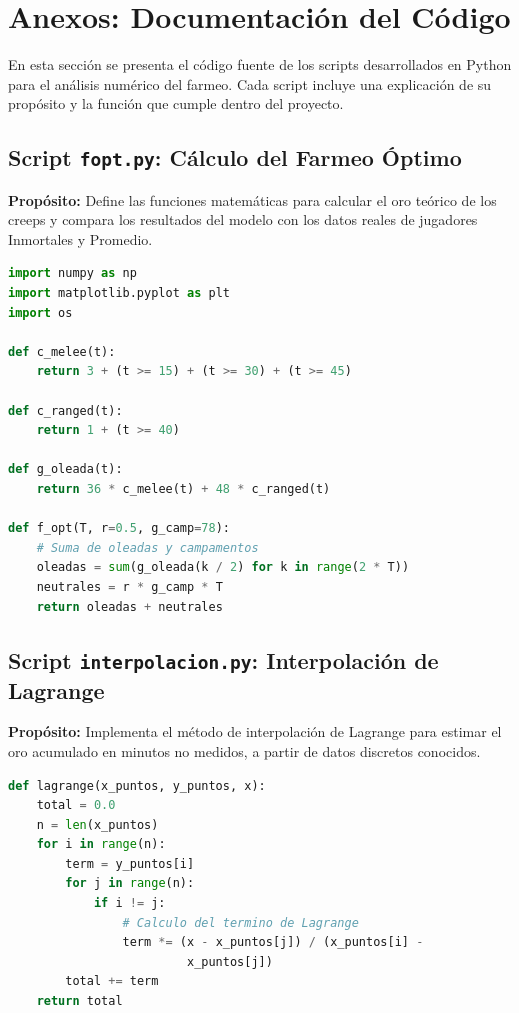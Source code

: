 \section{Anexos: Documentación del Código}

En esta sección se presenta el código fuente de los scripts desarrollados en Python para el análisis numérico del farmeo. Cada script incluye una explicación de su propósito y la función que cumple dentro del proyecto.

\subsection{Script \texttt{fopt.py}: Cálculo del Farmeo Óptimo}
\textbf{Propósito:} Define las funciones matemáticas para calcular el oro teórico de los creeps y compara los resultados del modelo con los datos reales de jugadores Inmortales y Promedio.

\begin{lstlisting}[language=Python, frame=single, rulecolor=\color{black}, backgroundcolor=\color{backcolour}, caption=Código principal de \texttt{fopt.py}]
import numpy as np
import matplotlib.pyplot as plt
import os

def c_melee(t):
    return 3 + (t >= 15) + (t >= 30) + (t >= 45)

def c_ranged(t):
    return 1 + (t >= 40)

def g_oleada(t):
    return 36 * c_melee(t) + 48 * c_ranged(t)

def f_opt(T, r=0.5, g_camp=78):
    # Suma de oleadas y campamentos
    oleadas = sum(g_oleada(k / 2) for k in range(2 * T))
    neutrales = r * g_camp * T
    return oleadas + neutrales
\end{lstlisting}

\subsection{Script \texttt{interpolacion.py}: Interpolación de Lagrange}
\textbf{Propósito:} Implementa el método de interpolación de Lagrange para estimar el oro acumulado en minutos no medidos, a partir de datos discretos conocidos.

\begin{lstlisting}[language=Python, frame=single, rulecolor=\color{black}, backgroundcolor=\color{backcolour}, caption=Código principal de \texttt{interpolacion.py}]
def lagrange(x_puntos, y_puntos, x):
    total = 0.0
    n = len(x_puntos)
    for i in range(n):
        term = y_puntos[i]
        for j in range(n):
            if i != j:
                # Calculo del termino de Lagrange
                term *= (x - x_puntos[j]) / (x_puntos[i] - 
                         x_puntos[j])
        total += term
    return total
\end{lstlisting}

